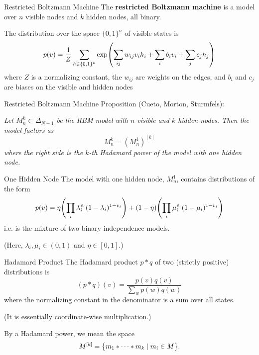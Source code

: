 \documentclass[mathserif,xcolor=dvipsnames]{beamer}
\begin{document}
\begin{frame}{Restricted Boltzmann Machine}
    The \textbf{restricted Boltzmann machine} is a model over $n$ visible nodes
    and $k$ hidden nodes, all binary.
    \begin{center}
    \end{center}
    \vspace{-0.3cm}
    The distribution over the space $\{0,1\}^n$ of visible states is
    \[
        p(v) = \frac 1 Z \sum_{h \in \{0,1\}^k}
        \exp\pdil*{
            \sum_{ij} w_{ij} v_i h_i + \sum_i b_i v_i + \sum_j c_j h_j
        }
    \]
    where $Z$ is a normalizing constant, the $w_{ij}$ are weights on the edges,
    and $b_i$ and $c_j$ are biases on the visible and hidden nodes
\end{frame}

\begin{frame}{Restricted Boltzmann Machine}
    Proposition (Cueto, Morton, Sturmfels):
    
    \linespace
    \textit{Let $M_n^k \subset \Delta_{N-1}$ be the RBM model
    with $n$ visible and $k$ hidden nodes.  Then the model factors as
    \[
        M_n^k = (M_n^1)^{[k]}
    \]
    where the right side is the $k$-th Hadamard power of the model with one
    hidden node.}
\end{frame}

\begin{frame}{One Hidden Node}
    The model with one hidden node, $M_n^1$, contains distributions of the form
    \[
        p(v) = \eta \pdil*{\prod_i \lambda_i^{v_i} (1 - \lambda_i)^{1 - v_i}}
        + (1 - \eta) \pdil*{\prod_i \mu_i^{v_i} (1 - \mu_i)^{1 - v_i}}
    \]
    i.e. is the mixture of two binary independence models.

    \linespace
    (Here, $\lambda_i, \mu_i \in (0,1)$ and $\eta \in [0,1]$.)
\end{frame}

\begin{frame}{Hadamard Product}
    The Hadamard product $p * q$ of two (strictly positive) distributions is 
    \[
        (p*q)(v) = \frac{p(v)q(v)}{\sum_w p(w) q(w)}
    \]
    where the normalizing constant in the denominator is a sum over all states.

    \linespace
    (It is essentially coordinate-wise multiplication.)

    \linespace
    By a Hadamard power, we mean the space
    \[
        M^{[k]} = \cdil[\big]{ m_1 * \cdots * m_k \mid m_i \in M }.
    \]
\end{frame}
\end{document}
